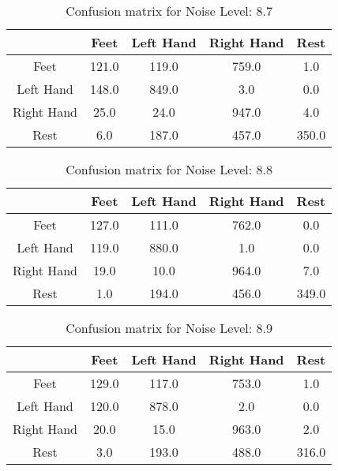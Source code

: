 \begin{table}[!htbp]
    \centering
    \begin{tabular}{|c||c|c|c|c|}
        \hline
		 & Feet & Left Hand & Right Hand & Rest \\
        \hline
        \hline
        Feet & 121.0 & 119.0 & 759.0 & 1.0 \\
        \hline
        Left Hand & 148.0 & 849.0 & 3.0 & 0.0 \\
        \hline
        Right Hand & 25.0 & 24.0 & 947.0 & 4.0 \\
        \hline
        Rest & 6.0 & 187.0 & 457.0 & 350.0 \\
        \hline
    \end{tabular}
    \caption{Confusion matrix for Noise Level: 8.7}
\end{table}

\begin{table}[!htbp]
    \centering
    \begin{tabular}{|c||c|c|c|c|}
        \hline
		 & Feet & Left Hand & Right Hand & Rest \\
        \hline
        \hline
        Feet & 127.0 & 111.0 & 762.0 & 0.0 \\
        \hline
        Left Hand & 119.0 & 880.0 & 1.0 & 0.0 \\
        \hline
        Right Hand & 19.0 & 10.0 & 964.0 & 7.0 \\
        \hline
        Rest & 1.0 & 194.0 & 456.0 & 349.0 \\
        \hline
    \end{tabular}
    \caption{Confusion matrix for Noise Level: 8.8}
\end{table}

\begin{table}[!htbp]
    \centering
    \begin{tabular}{|c||c|c|c|c|}
        \hline
		 & Feet & Left Hand & Right Hand & Rest \\
        \hline
        \hline
        Feet & 129.0 & 117.0 & 753.0 & 1.0 \\
        \hline
        Left Hand & 120.0 & 878.0 & 2.0 & 0.0 \\
        \hline
        Right Hand & 20.0 & 15.0 & 963.0 & 2.0 \\
        \hline
        Rest & 3.0 & 193.0 & 488.0 & 316.0 \\
        \hline
    \end{tabular}
    \caption{Confusion matrix for Noise Level: 8.9}
\end{table}

